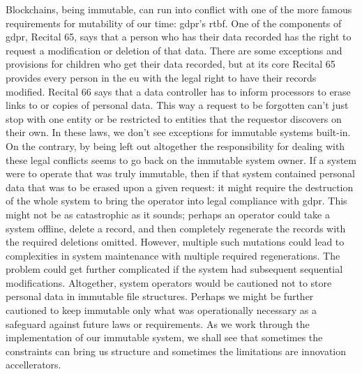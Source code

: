 Blockchains, being immutable, can run into conflict with one of the more famous requirements for mutability of our time:   \gls{gdpr}'s \gls{rtbf}.  One of the components of \gls{gdpr}, Recital 65, says that a person who has their data recorded has the right to request a modification or deletion of that data.  There are some exceptions and provisions for children who get their data recorded, but at its core Recital 65 provides every person in the \gls{eu} with the legal right to have their records modified.    Recital 66 says that a data controller has to inform processors to erase links to or copies of personal data.  This way a request to be forgotten can't just stop with one entity or be restricted to entities that the requestor discovers on their own.    In these laws, we don't see exceptions for immutable systems built-in.  On the contrary, by being left out altogether the responsibility for dealing with these legal conflicts seems to go back on the \gls{immutable system} owner.  If a system were to operate that was truly immutable, then if that system contained personal data that was to be erased upon a given request:  it might require the destruction of the whole system to bring the operator into legal compliance with \gls{gdpr}.  This might not be as catastrophic as it sounds; perhaps an operator could take a system offline, delete a record, and then completely regenerate the records with the required deletions omitted.  However, multiple such mutations could lead to complexities in system maintenance with multiple required regenerations.  The problem could get further complicated if the system had subsequent sequential modifications.  Altogether, system operators would be cautioned not to store personal data in immutable file structures.  Perhaps we might be further cautioned to keep immutable only what was operationally necessary as a safeguard against future laws or requirements.  As we work through the implementation of our \gls{immutable system}, we shall see that sometimes the constraints can bring us structure and sometimes the limitations are innovation accellerators.

